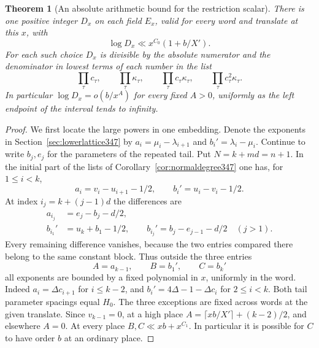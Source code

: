 \documentclass[a4paper,11pt]{article}
\newtheorem{theorem}[proposition]{Theorem}
\theoremstyle{definition}
\theoremstyle{remark}
\numberwithin{equation}{section}
\begin{document}
\begin{theorem}[An absolute arithmetic bound for the restriction scalar]\leavevmode
\label{thm:abslow349}
There is one positive integer \(D_x\) on each field \(E_x\),
valid for every word and translate at this \(x\), with
\[
            \log D_x\ll x^{C_0}(1+b/X') .
\]
For each such choice \(D_x\) is divisible by the absolute
numerator and the denominator in lowest terms of each number in
the list
\[
         \prod_\tau c_\tau,\qquad
         \prod_\tau \kappa_\tau,\qquad
         \prod_\tau c_\tau\kappa_\tau,\qquad
         \prod_\tau c_\tau^2\kappa_\tau .
\]
In particular \(\log D_x=o(b/x^A)\) for every fixed \(A>0\),
uniformly as the left endpoint of the interval tends to infinity.
\end{theorem}
\begin{proof}
We first locate the large powers in one embedding. Denote the
exponents in Section~\ref{sec:lowerlattice347} by
\(a_i=\mu_i-\lambda_{i+1}\) and \(b_i'=\lambda_i-\mu_i\).
Continue to write \(b_j,e_j\) for the parameters of the repeated
tail. Put \(N=k+md=n+1\). In the initial part of the lists of
Corollary~\ref{cor:normaldegree347} one has, for \(1\le i<k\),
\[
        a_i=v_i-u_{i+1}-1/2,\qquad b_i'=u_i-v_i-1/2 .
\]
At index \(i_j=k+(j-1)d\) the differences are
\[
 \begin{split}
 a_{i_j}&=e_j-b_j-d/2,\\
 b_{i_1}'&=u_k+b_1-1/2,\qquad
 b_{i_j}'=b_j-e_{j-1}-d/2\quad(j>1).
 \end{split}
\]
Every remaining difference vanishes, because the two entries
compared there belong to the same constant block. Thus outside
the three entries
\[
                  A=a_{k-1},\qquad B=b_1',\qquad C=b_k'
\]
all exponents are bounded by a fixed polynomial in \(x\),
uniformly in the word. Indeed \(a_i=\Delta c_{i+1}\) for
\(i\le k-2\), and \(b_i'=4\Delta-1-\Delta c_i\) for
\(2\le i<k\). Both tail parameter spacings equal \(H_0\).
The three exceptions are fixed across words at the given translate.
Since \(v_{k-1}=0\), at a high place
\(A=\lceil xb/X'\rceil+(k-2)/2\), and elsewhere \(A=0\).
At every place \(B,C\ll xb+x^{C_1}\). In particular it is
possible for \(C\) to have order \(b\) at an ordinary place.


\end{proof}
\end{document}
